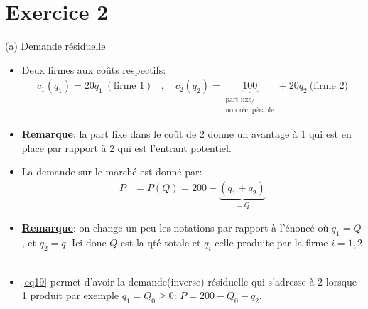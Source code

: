 \section{Exercice 2}
\frame{\sectionpage}
\begin{frame}[allowframebreaks]{(a) Demande résiduelle}
\begin{itemize}
    \item Deux firmes aux coûts respectifs: 
    \begin{align}
     c_1(q_1) = 20q_1 \ (\text{firme 1}) 
     &,  \quad c_2(q_2) = 
     \underbrace{100}_{\substack{\text{part fixe/}\\\text{non récupérable}}} + 20q_2 \ \text{(firme 2)}
     \label{eq18}
    \end{align}
    \item \textbf{\underline{Remarque}}: la part fixe dans le coût de 2 donne un avantage 
    à 1 qui est en place par rapport à 2 qui est l'entrant potentiel.
    \item La demande sur le marché est donné par: 
    \begin{align}
        P&= P(Q) = 200 - \underbrace{(q_1 + q_2)}_{= Q}
        \label{eq19}
    \end{align}
    \item \textbf{\underline{Remarque}}: on change un peu les notations par rapport à l'énoncé où $q_1=Q$, et $q_2 = q$. Ici donc  
    $Q$ est la qté totale et $q_i$ celle produite par la firme $i=1, 2$.
    \item \eqref{eq19} permet d'avoir la demande(inverse) résiduelle qui s'adresse à 2 lorsque 1 produit par exemple $q_1=Q_0\geq 0$: $P=200-Q_0-q_2$.
\end{itemize}
\end{frame}
